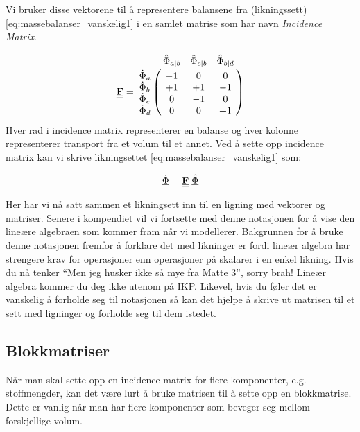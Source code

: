 Vi bruker disse vektorene til å representere balansene fra (likningssett) \ref{eq:massebalanser_vanskelig1} i en samlet matrise som har navn \textit{Incidence Matrix}.

\begin{equation}
    \textbf{\doubleunderline{F}} = 
    \bordermatrix{~ & \hat{\Phi}_{a|b} & \hat{\Phi}_{c|b}  & \hat{\Phi}_{b|d} \cr
                  \dot{\Phi}_a & -1 & 0 & 0 \cr
                  \dot{\Phi}_b & +1 & +1 & -1\cr
                  \dot{\Phi}_c & 0 & -1 & 0\cr
                  \dot{\Phi}_d & 0 & 0 & +1
                  }
\end{equation}
Hver rad i incidence matrix representerer en balanse og hver kolonne representerer transport fra et volum til et annet. Ved å sette opp incidence matrix kan vi skrive likningsettet \ref{eq:massebalanser_vanskelig1} som:

\begin{equation}
   \underline{\dot{\Phi}} = \textbf{\underline{\underline{F}}}\hspace{0.1cm}\underline{\hat{\Phi}}
\end{equation}

Her har vi nå satt sammen et likningsett inn til en ligning med vektorer og matriser. Senere i kompendiet vil vi fortsette med denne notasjonen for å vise den lineære algebraen som kommer fram når vi modellerer. Bakgrunnen for å bruke denne notasjonen fremfor å forklare det med likninger er fordi lineær algebra har strengere krav for operasjoner enn operasjoner på skalarer i en enkel likning. Hvis du nå tenker ``Men jeg husker ikke så mye fra Matte 3'', sorry brah! Lineær algebra kommer du deg ikke utenom på IKP. Likevel, hvis du føler det er vanskelig å forholde seg til notasjonen så kan det hjelpe å skrive ut matrisen til et sett med ligninger og forholde seg til dem istedet. 

\clearpage
\subsection{Blokkmatriser}
Når man skal sette opp en incidence matrix for flere komponenter, e.g. stoffmengder, kan det være lurt å bruke matrisen til å sette opp en blokkmatrise. Dette er vanlig når man har flere komponenter som beveger seg mellom forskjellige volum. 

